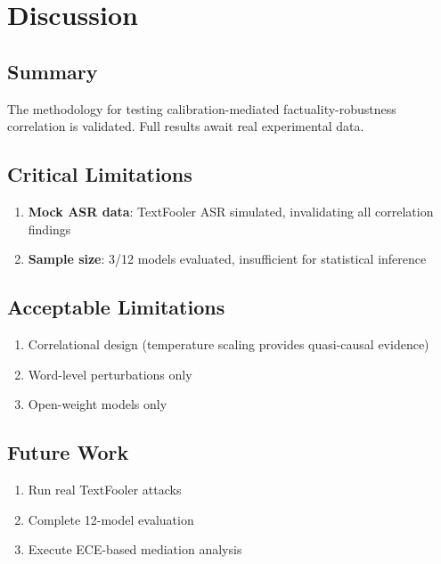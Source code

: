 \section{Discussion}

\subsection{Summary}

The methodology for testing calibration-mediated factuality-robustness correlation is validated. Full results await real experimental data.

\subsection{Critical Limitations}

\begin{enumerate}
    \item \textbf{Mock ASR data}: TextFooler ASR simulated, invalidating all correlation findings
    \item \textbf{Sample size}: 3/12 models evaluated, insufficient for statistical inference
\end{enumerate}

\subsection{Acceptable Limitations}

\begin{enumerate}
    \item Correlational design (temperature scaling provides quasi-causal evidence)
    \item Word-level perturbations only
    \item Open-weight models only
\end{enumerate}

\subsection{Future Work}

\begin{enumerate}
    \item Run real TextFooler attacks
    \item Complete 12-model evaluation
    \item Execute ECE-based mediation analysis
\end{enumerate}
